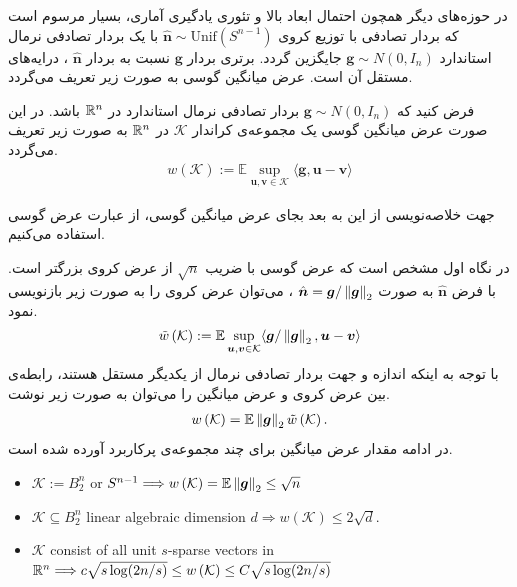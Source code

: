 در حوزه‌های دیگر همچون احتمال ابعاد بالا و تئوری یادگیری آماری، بسیار مرسوم است که بردار تصادفی با توزیع کروی
$\hat{\bm{n}} \sim \text{Unif}(S^{n-1})$
با یک بردار تصادفی نرمال استاندارد 
$\bm{g} \sim N (0,I_n)$
جایگزین گردد. برتری بردار
$\bm{g}$
نسبت به بردار
$\hat{\bm{n}}$
، درایه‌های مستقل آن است. عرض میانگین گوسی به صورت زیر تعریف می‌گردد.
\begin{definition}
فرض کنید که 
$\bm{g} \sim N (0,I_n)$
بردار تصادفی نرمال استاندارد در
$\mathbb{R}^{n}$
باشد. در این صورت عرض میانگین گوسی یک مجموعه‌ی کراندار
$\mathcal{K}$
در 
$\mathbb{R}^{n}$
به صورت زیر تعریف می‌گردد.
\begin{align}
\label{eq:eq14}
w\left(\mathcal{K}\right) := \mathbb{E} \sup_{\bm{u},\bm{v}\in \mathcal{K}} \langle \bm{g}, \bm{u}-\bm{v}  \rangle
\end{align}	
\end{definition}
جهت خلاصه‌نویسی از این به بعد بجای عرض میانگین گوسی، از عبارت عرض گوسی استفاده می‌کنیم.


در نگاه اول مشخص است که عرض گوسی با ضریب 
$\sqrt{n}$
از عرض کروی بزرگتر است. با فرض
$\hat{\bm{n}}$
به صورت
$\hat{\bm{n}}= \bm{g} / \left\lVert\bm{g}\right\rVert_{2}$
، می‌توان عرض  کروی را به صورت زیر بازنویسی نمود. 
\begin{align}
\tilde{w}\left(\mathcal{K}\right) := \mathbb{E} \sup_{\bm{u},\bm{v}\in \mathcal{K}} \langle \bm{g} / \left\lVert\bm{g}\right\rVert_{2}, \bm{u}-\bm{v}  \rangle
\end{align}
با توجه به اینکه اندازه و جهت  بردار تصادفی نرمال از یکدیگر مستقل هستند، رابطه‌ی بین عرض کروی و عرض میانگین را می‌توان به صورت زیر نوشت.
\begin{align}
w\left(\mathcal{K}\right) =  \mathbb{E} \left\lVert\bm{g}\right\rVert_{2} \tilde{w}\left(\mathcal{K}\right).
\end{align} 
در ادامه مقدار عرض میانگین برای چند مجموعه‌ی پرکاربرد آورده شده است.
\begin{latin}
\begin{itemize}
\item{$\mathcal{K}:= B_{2}^{n}$ or $S^{n-1} \Longrightarrow w\left(\mathcal{K}\right) =\mathbb{E} \left\lVert\bm{g}\right\rVert_{2} \leq \sqrt{n}$ }
\item{$\mathcal{K} \subseteq B_{2}^{n}$ linear algebraic dimension $d \Longrightarrow w\left(\mathcal{K}\right)\leq 2\sqrt{d} $.}
\item{$\mathcal{K}$ consist of all unit $s$-sparse vectors in $\mathbb{R}^{n}\Longrightarrow c\sqrt{s \log(2n/s)} \leq w\left(\mathcal{K}\right) \leq C\sqrt{s \log(2n/s)} $} 
\end{itemize}
\end{latin}

